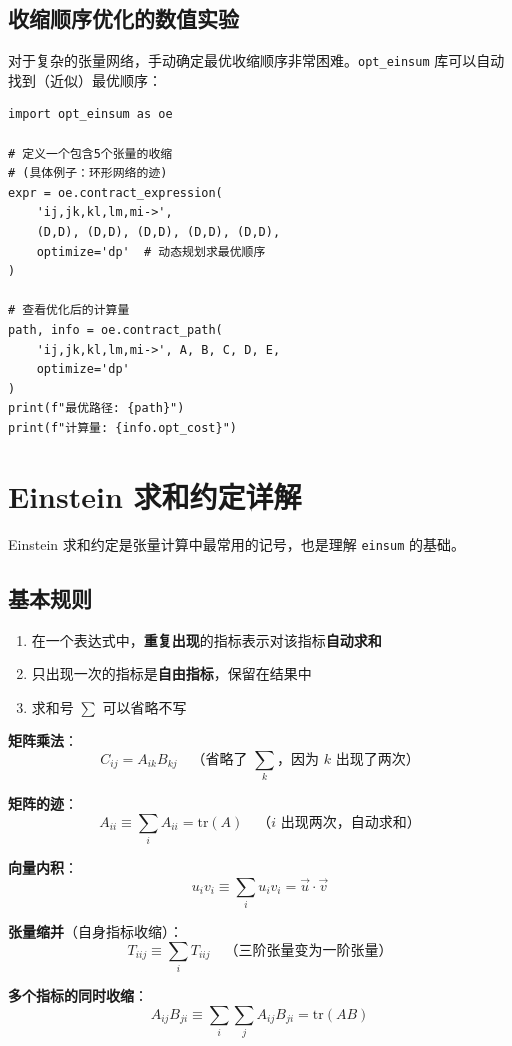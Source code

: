 \documentclass[12pt,a4paper]{ctexart}
\begin{document}
\subsection{收缩顺序优化的数值实验}

\begin{examplebox}
对于复杂的张量网络，手动确定最优收缩顺序非常困难。\texttt{opt\_einsum} 库可以自动找到（近似）最优顺序：

\begin{verbatim}
import opt_einsum as oe

# 定义一个包含5个张量的收缩
# (具体例子：环形网络的迹)
expr = oe.contract_expression(
    'ij,jk,kl,lm,mi->',
    (D,D), (D,D), (D,D), (D,D), (D,D),
    optimize='dp'  # 动态规划求最优顺序
)

# 查看优化后的计算量
path, info = oe.contract_path(
    'ij,jk,kl,lm,mi->', A, B, C, D, E,
    optimize='dp'
)
print(f"最优路径: {path}")
print(f"计算量: {info.opt_cost}")
\end{verbatim}
\end{examplebox}

\section{Einstein 求和约定详解}

Einstein 求和约定是张量计算中最常用的记号，也是理解 \texttt{einsum} 的基础。

\subsection{基本规则}

\begin{keybox}
\begin{enumerate}
    \item 在一个表达式中，\textbf{重复出现}的指标表示对该指标\textbf{自动求和}
    \item 只出现一次的指标是\textbf{自由指标}，保留在结果中
    \item 求和号 $\sum$ 可以省略不写
\end{enumerate}
\end{keybox}

\begin{examplebox}
\textbf{矩阵乘法}：
\[
C_{ij} = A_{ik} B_{kj} \quad \text{（省略了 $\sum_k$，因为 $k$ 出现了两次）}
\]

\textbf{矩阵的迹}：
\[
A_{ii} \equiv \sum_i A_{ii} = \text{tr}(A) \quad \text{（$i$ 出现两次，自动求和）}
\]

\textbf{向量内积}：
\[
u_i v_i \equiv \sum_i u_i v_i = \vec{u} \cdot \vec{v}
\]

\textbf{张量缩并}（自身指标收缩）：
\[
T_{iij} \equiv \sum_i T_{iij} \quad \text{（三阶张量变为一阶张量）}
\]

\textbf{多个指标的同时收缩}：
\[
A_{ij} B_{ji} \equiv \sum_i \sum_j A_{ij} B_{ji} = \text{tr}(AB)
\]
\end{examplebox}
\end{document}
